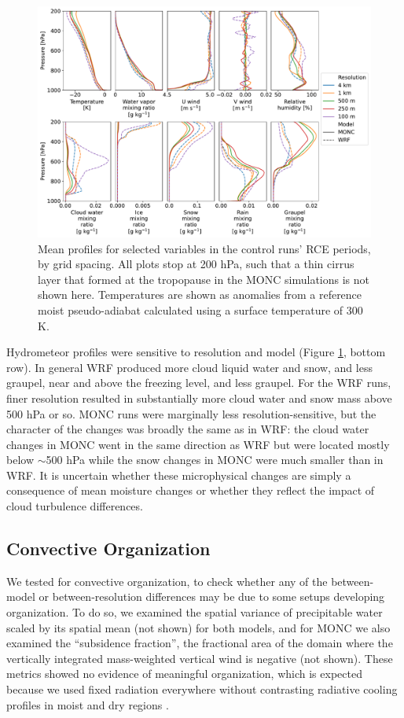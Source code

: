 \documentclass[draft]{agujournal2019}
\begin{document}
\begin{figure}[h]
    \noindent\includegraphics[width=\textwidth]{figures/rce_profiles}
    \caption{Mean profiles for selected variables in the control runs' RCE
    periods, by grid spacing. All plots stop at 200 hPa, such that a thin cirrus
    layer that formed at the tropopause in the MONC simulations is not shown
    here. Temperatures are shown as anomalies from a reference moist
    pseudo-adiabat calculated using a surface temperature of 300 K.}
    \label{fig:rce_profiles}
\end{figure}

Hydrometeor profiles were sensitive to resolution and model (Figure
\ref{fig:rce_profiles}, bottom row). In general WRF produced more cloud liquid
water and snow, and less graupel, near and above the freezing level, and less
graupel. For the WRF runs, finer resolution resulted in substantially more cloud
water and snow mass above 500 hPa or so. MONC runs were marginally less
resolution-sensitive, but the character of the changes was broadly the same as
in WRF: the cloud water changes in MONC went in the same direction as WRF but
were located mostly below $\sim$500 hPa while the snow changes in MONC were much
smaller than in WRF. It is uncertain whether these microphysical changes are
simply a consequence of mean moisture changes or whether they reflect the impact
of cloud turbulence differences.

\subsection{Convective Organization}

We tested for convective organization, to check whether any of the between-model
or between-resolution differences may be due to some setups developing
organization. To do so, we examined the spatial variance of precipitable water
scaled by its spatial mean (not shown) for both models, and for MONC we also
examined the ``subsidence fraction'', the fractional area of the domain where
the vertically integrated mass-weighted vertical wind is negative (not shown).
These metrics showed no evidence of meaningful organization, which is expected
because we used fixed radiation everywhere without contrasting radiative cooling
profiles in moist and dry regions \cite{Muller_GRL_2015}.
\end{document}
